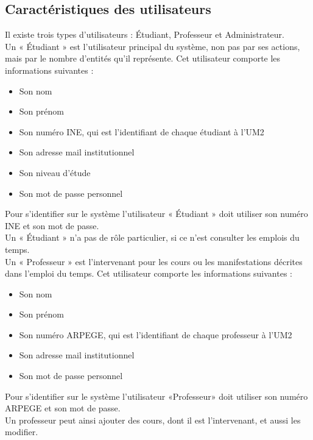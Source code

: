 \documentclass[a4paper, 11pt]{article}
\begin{document}
        \subsection{ Caractéristiques des utilisateurs}
        Il existe trois types d'utilisateurs : Étudiant, Professeur et Administrateur.\\Un « Étudiant » est l'utilisateur principal du système, non pas par ses actions, mais par le nombre d'entités qu'il représente. Cet utilisateur comporte les informations suivantes :
        \begin{itemize}
        \item Son nom
        \item Son prénom
        \item Son numéro INE, qui est l'identifiant de chaque étudiant à l'UM2
        \item Son adresse mail institutionnel
        \item Son niveau d'étude
        \item Son mot de passe personnel
        \end{itemize}
Pour s'identifier sur le système l'utilisateur « Étudiant » doit utiliser son numéro INE et son mot de passe.\\Un « Étudiant » n'a pas de rôle particulier, si ce n'est consulter les emplois du temps.
\\Un « Professeur » est l'intervenant pour les cours ou les manifestations décrites dans l'emploi du temps. Cet utilisateur comporte les informations suivantes :
        \begin{itemize}
        \item Son nom
        \item Son prénom
        \item Son numéro ARPEGE, qui est l'identifiant de chaque professeur à l'UM2
        \item Son adresse mail institutionnel
        \item Son mot de passe personnel
        \end{itemize}
Pour s'identifier sur le système l'utilisateur «Professeur» doit utiliser son numéro ARPEGE et son mot de passe.\\
Un professeur peut ainsi ajouter des cours, dont il est l'intervenant, et aussi les modifier.
\end{document}
